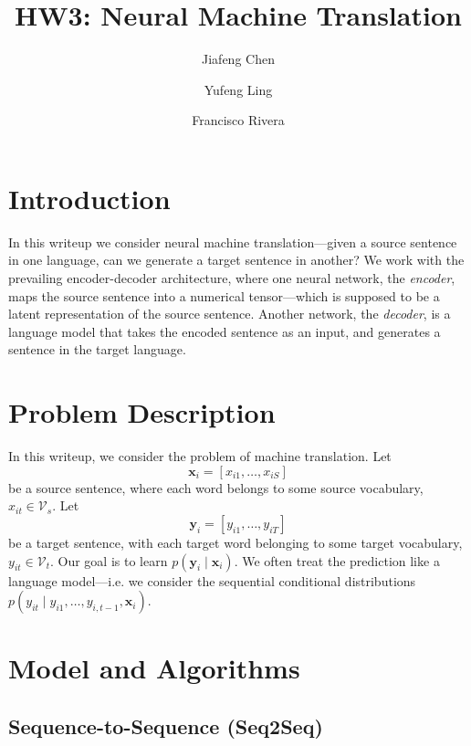 \documentclass[12pt]{article}
\title{HW3: Neural Machine Translation}
\author{Jiafeng Chen \and Yufeng Ling \and
Francisco Rivera}
\newcommand{\sts}{Seq2Seq}
\begin{document}
\maketitle

\section{Introduction}
In this writeup we consider neural machine translation---given a source sentence in one language, can we generate a target sentence in another? We work with the prevailing encoder-decoder architecture, where one neural network, the \emph{encoder}, maps the source sentence into a numerical tensor---which is supposed to be a latent representation of the source sentence. Another network, the \emph{decoder}, is a language model that takes the encoded sentence as an input, and generates a sentence in the target language. 

\section{Problem Description}
In this writeup, we consider the problem of machine translation. Let \[\bm x_i = [x_{i1},\ldots,x_{iS}]\] be a source sentence, where each word belongs to some source vocabulary, $x_{it} \in \mathcal V_s$. Let \[\bm y_i = [y_{i1},\ldots,y_{iT}]\] be a target sentence, with each target word belonging to some target vocabulary, $y_{it} \in \mathcal V_t$. Our goal is to learn $p(\bm y_i \mid \bm x_i)$. We often treat the prediction like a language model---i.e. we consider the sequential conditional distributions $p(y_{it} \mid y_{i1},\ldots,y_{i,t-1}, \bm x_i)$.


\section{Model and Algorithms}

\subsection{Sequence-to-Sequence (\sts)}
\label{sub:seq2seq}
\end{document}
